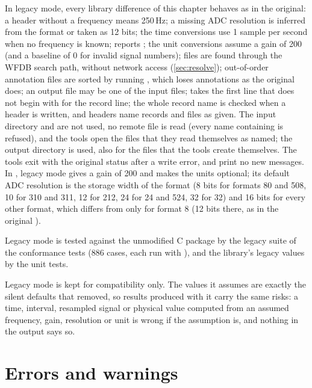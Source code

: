 In legacy mode, every library difference of this chapter behaves as in the
original: a header without a frequency means 250\,Hz; a missing ADC
resolution is inferred from the format or taken as 12 bits; the time
conversions use 1 sample per second when no frequency is known;
 reports ; the unit conversions
assume a gain of 200 (and a baseline of 0 for invalid signal numbers); files
are found through the WFDB search path, without network access
(\cref{sec:resolve}); out-of-order annotation files are sorted by running
, which loses annotations as the original does; an output file
may be one of the input files;  takes the first line that does
not begin with \code{\#} for the record line; the whole record name is
checked when a header is written, and headers name records and files as
given. The input directory and  are not used, no remote
file is read (every name containing \code{://} is refused), and the tools
open the files that they read themselves as named; the output directory is
used, also for the files that the tools create themselves. The tools exit
with the original status after a write error, and print no new messages. In , legacy mode
gives a gain of 200 and makes the units optional; its default ADC
resolution is the storage width of the format (8 bits for formats 80 and
508, 10 for 310 and 311, 12 for 212, 24 for 24 and 524, 32 for 32) and 16
bits for every other format, which differs from  only
for format 8 (12 bits there, as in the original ).

Legacy mode is tested against the unmodified C package by the legacy suite
of the conformance tests (886 cases, each run with ), and the
library's legacy values by the unit tests.

\begin{note}
Legacy mode is kept for compatibility only. The values it assumes are
exactly the silent defaults that \wfdbx{} removed, so results produced with
it carry the same risks: a time, interval, resampled signal or physical value
computed from an assumed frequency, gain, resolution or unit is wrong if the
assumption is, and nothing in the output says so.
\end{note}

\section{Errors and warnings}
\label{sec:errors}

